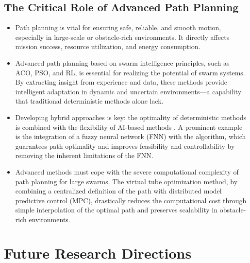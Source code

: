 \subsection{The Critical Role of Advanced Path Planning}

\begin{itemize}
  \item {} Path planning is vital for
        ensuring safe, reliable, and smooth motion, especially in large-scale or
        obstacle-rich environments. It directly affects mission success, resource
        utilization, and energy consumption.
  \item {} Advanced path planning based on
        swarm intelligence principles, such as ACO, PSO, and RL, is essential for
        realizing the potential of swarm systems. By extracting insight from
        experience and data, these methods provide intelligent adaptation in
        dynamic and uncertain environments---a capability that traditional
        deterministic methods alone lack.
  \item {} Developing hybrid
        approaches is key: the optimality of deterministic methods is combined
        with the flexibility of AI-based methods \cite{abujabal2024path}. A prominent example is
        the integration of a fuzzy neural network (FNN) with the \Astar{}
        algorithm, which guarantees path optimality and improves feasibility and
        controllability by removing the inherent limitations of the FNN.
  \item {} Advanced
        methods must cope with the severe computational complexity of path
        planning for large swarms. The virtual tube optimization method, by
        combining a centralized definition of the path with distributed model
        predictive control (MPC), drastically reduces the computational cost
        through simple interpolation of the optimal path and preserves
        scalability in obstacle-rich environments.
\end{itemize}

\section{Future Research Directions}\label{sec:future}

